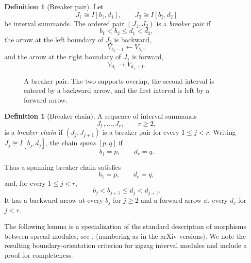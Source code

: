 \documentclass[11pt]{amsart}
\numberwithin{equation}{section}
\theoremstyle{definition}
\newtheorem{definition}[theorem]{Definition}
\begin{document}
\begin{definition}[Breaker pair]\label{def:breaker-pair}
Let
\[
J_1\cong I[b_1,d_1],
\qquad
J_2\cong I[b_2,d_2]
\]
be interval summands.  The ordered pair $(J_1,J_2)$ is a \emph{breaker pair}
if
\[
b_1<b_2\le d_1<d_2,
\]
the arrow at the left boundary of $J_2$ is backward,
\[
V_{b_2-1}\longleftarrow V_{b_2},
\]
and the arrow at the right boundary of $J_1$ is forward,
\[
V_{d_1}\longrightarrow V_{d_1+1}.
\]
\end{definition}

\begin{figure}[h]
\centering
{}
\caption{A breaker pair.  The two supports overlap, the second interval is
entered by a backward arrow, and the first interval is left by a forward
arrow.}
\label{fig:breaker-pair}
\end{figure}

\begin{definition}[Breaker chain]\label{def:breaker-chain}
A sequence of interval summands
\[
J_1,\dots,J_r,
\qquad r\ge2,
\]
is a \emph{breaker chain} if $(J_j,J_{j+1})$ is a breaker pair for every
$1\le j<r$.  Writing $J_j\cong I[b_j,d_j]$, the chain \emph{spans $[p,q]$}
if
\[
b_1=p,
\qquad
d_r=q.
\]
\end{definition}

Thus a spanning breaker chain satisfies
\[
b_1=p,\qquad d_r=q,
\]
and, for every $1\le j<r$,
\[
b_j<b_{j+1}\le d_j<d_{j+1}.
\]
It has a backward arrow at every $b_j$ for $j\ge2$ and a forward arrow at
every $d_j$ for $j<r$.


\medskip 
The following lemma is a specialization of the standard description of
morphisms between spread modules, see \cite[Proposition 5.5]{BBH2}, \cite[Prop. 2.7]{BBH} (numbering as in the  arXiv versions). 
We note the resulting boundary-orientation criterion for zigzag interval
modules and include a proof for completeness.
\end{document}
